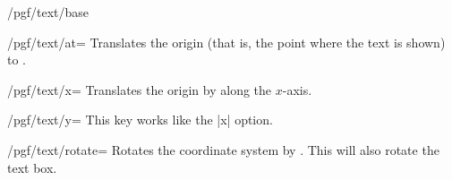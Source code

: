 \begin{command}{\pgftext{}}
\begin{key}{/pgf/text/base}
\begin{codeexample}[]
\end{codeexample}
  \end{key}
  \begin{key}{/pgf/text/at=}
    Translates the origin (that is, the point where the text is
    shown) to . 
\begin{codeexample}[]
\end{codeexample}
  \end{key}
  \begin{key}{/pgf/text/x=}
    Translates the origin by  along the $x$-axis.
\begin{codeexample}[]
\end{codeexample}
  \end{key}
  \begin{key}{/pgf/text/y=}
    This key works like the |x| option.
  \end{key}
  \begin{key}{/pgf/text/rotate=}
    Rotates the coordinate system by . This will also
    rotate the text box.
\begin{codeexample}[]
\end{codeexample}
\end{key}
  
\end{command}


